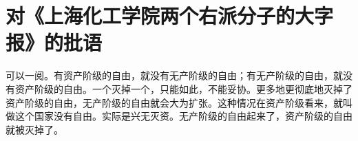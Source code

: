 \section[对《上海化工学院两个右派分子的大字报》的批语（一九五八年三月二十二日）]{对《上海化工学院两个右派分子的大字报》的批语}


可以一阅。有资产阶级的自由，就没有无产阶级的自由；有无产阶级的自由，就没有资产阶级的自由。一个灭掉一个，只能如此，不能妥协。更多地更彻底地灭掉了资产阶级的自由，无产阶级的自由就会大为扩张。这种情况在资产阶级看来，就叫做这个国家没有自由。实际是兴无灭资。无产阶级的自由起来了，资产阶级的自由就被灭掉了。


